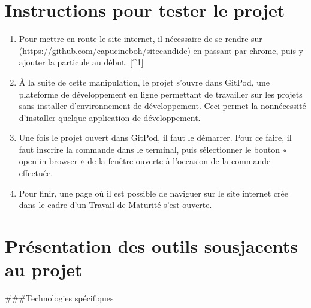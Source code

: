 \documentclass[a4,10pt,french]{sphinxmanual}
\begin{document}
\section{Instructions pour tester le projet}
\label{\detokenize{chapitre-02:instructions-pour-tester-le-projet}}\begin{enumerate}
%
\item {} 
\sphinxAtStartPar
Pour mettre en route le site internet, il nécessaire de se rendre sur  (https://github.com/capucineboh/site\sphinxhyphen{}candide) en passant par chrome, puis y ajouter la particule  au début.   {[}\textasciicircum{}1{]}

\item {} 
\sphinxAtStartPar
À la suite de cette manipulation, le projet s’ouvre dans GitPod, une plateforme de développement en ligne permettant de travailler sur les projets sans installer d’environnement de développement. Ceci permet la non\sphinxhyphen{}nécessité d’installer quelque application de développement.

\item {} 
\sphinxAtStartPar
Une fois le projet ouvert dans GitPod, il faut le démarrer. Pour ce faire, il faut inscrire la commande  dans le terminal, puis sélectionner le bouton « open in browser » de la fenêtre ouverte à l’occasion de la commande effectuée.

\item {} 
\sphinxAtStartPar
Pour finir, une page où il est possible de naviguer sur le site internet crée dans le cadre d’un Travail de Maturité s’est ouverte.

\end{enumerate}


\section{Présentation des outils sous\sphinxhyphen{}jacents au projet}
\label{\detokenize{chapitre-02:presentation-des-outils-sous-jacents-au-projet}}
\sphinxAtStartPar
\#\#\#Technologies spécifiques
\end{document}

